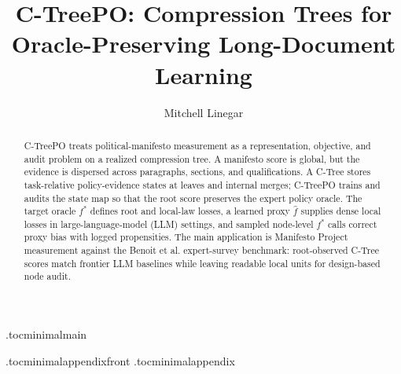 \documentclass[11pt]{article}
\title{C-TreePO: Compression Trees for Oracle-Preserving Long-Document Learning}
\author{Mitchell Linegar}
\date{}
\begin{document}
\maketitle

\begin{abstract}
C-TreePO treats political-manifesto measurement as a representation,
objective, and audit problem on a realized compression tree. A manifesto score
is global, but the evidence is dispersed across paragraphs, sections, and
qualifications. A C-Tree stores task-relative policy-evidence states at leaves
and internal merges; C-TreePO trains and audits the state map so that the root
score preserves the expert policy oracle. The target oracle \(f^\ast\) defines
root and local-law losses, a learned proxy \(\widehat f\) supplies dense
local losses in large-language-model (LLM) settings, and sampled node-level
\(f^\ast\) calls correct proxy bias with logged propensities. The main
application is Manifesto Project measurement against the Benoit et al.
expert-survey benchmark: root-observed C-Tree scores match frontier LLM
baselines while leaving readable local units for design-based node audit.
\end{abstract}

\tableofcontents
\clearpage

\etocdepthtag.toc{minimalmain}










\appendix
\etocdepthtag.toc{minimalappendixfront}
\appendixcontents
\etocdepthtag.toc{minimalappendix}










\clearpage


\end{document}
